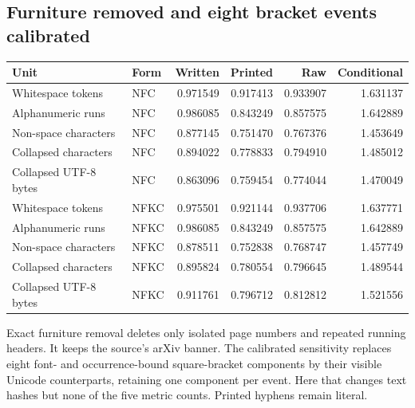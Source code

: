 \documentclass[a4paper,11pt]{article}
\begin{document}
{\subsection*{Furniture removed and eight bracket events calibrated}\begin{tabular}{@{}llrrrr@{}}\toprule Unit & Form & Written & Printed & Raw & Conditional\\\midrule Whitespace tokens & NFC & 0.971549 & 0.917413 & 0.933907 & 1.631137 \\
Alphanumeric runs & NFC & 0.986085 & 0.843249 & 0.857575 & 1.642889 \\
Non-space characters & NFC & 0.877145 & 0.751470 & 0.767376 & 1.453649 \\
Collapsed characters & NFC & 0.894022 & 0.778833 & 0.794910 & 1.485012 \\
Collapsed UTF-8 bytes & NFC & 0.863096 & 0.759454 & 0.774044 & 1.470049 \\
Whitespace tokens & NFKC & 0.975501 & 0.921144 & 0.937706 & 1.637771 \\
Alphanumeric runs & NFKC & 0.986085 & 0.843249 & 0.857575 & 1.642889 \\
Non-space characters & NFKC & 0.878511 & 0.752838 & 0.768747 & 1.457749 \\
Collapsed characters & NFKC & 0.895824 & 0.780554 & 0.796645 & 1.489544 \\
Collapsed UTF-8 bytes & NFKC & 0.911761 & 0.796712 & 0.812812 & 1.521556 \\\bottomrule\end{tabular}}

Exact furniture removal deletes only isolated page numbers and repeated running
headers. It keeps the source’s arXiv banner. The calibrated sensitivity replaces
eight font- and occurrence-bound square-bracket components by their visible
Unicode counterparts, retaining one component per event. Here that changes text
hashes but none of the five metric counts. Printed hyphens remain literal.
\end{document}

